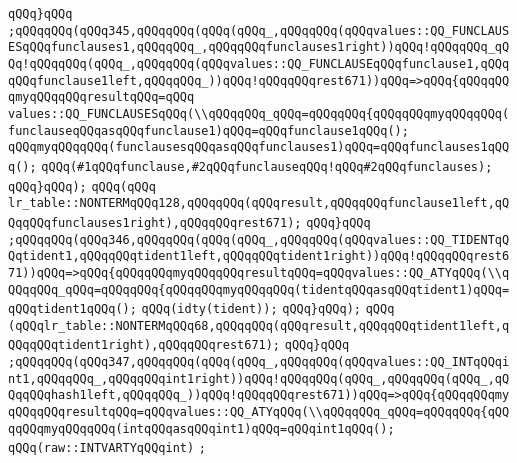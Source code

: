 \verb|qQQq}qQQq|\newline
\verb|;qQQqqQQq(qQQq345,qQQqqQQq(qQQq(qQQq_,qQQqqQQq(qQQqvalues::QQ_FUNCLAUSESqQQqfunclauses1,qQQqqQQq_,qQQqqQQqfunclauses1right))qQQq!qQQqqQQq_qQQq!qQQqqQQq(qQQq_,qQQqqQQq(qQQqvalues::QQ_FUNCLAUSEqQQqfunclause1,qQQqqQQqfunclause1left,qQQqqQQq_))qQQq!qQQqqQQqrest671))qQQq=>qQQq{qQQqqQQqmyqQQqqQQqresultqQQq=qQQq|\newline
\verb|values::QQ_FUNCLAUSESqQQq(\\qQQqqQQq_qQQq=qQQqqQQq{qQQqqQQqmyqQQqqQQq(funclauseqQQqasqQQqfunclause1)qQQq=qQQqfunclause1qQQq();|\newline
\verb|qQQqmyqQQqqQQq(funclausesqQQqasqQQqfunclauses1)qQQq=qQQqfunclauses1qQQq();|\newline
\verb|qQQq(#1qQQqfunclause,#2qQQqfunclauseqQQq!qQQq#2qQQqfunclauses);|\newline
\verb|qQQq}qQQq);|\newline
\verb|qQQq(qQQq|\newline
\verb|lr_table::NONTERMqQQq128,qQQqqQQq(qQQqresult,qQQqqQQqfunclause1left,qQQqqQQqfunclauses1right),qQQqqQQqrest671);|\newline
\verb|qQQq}qQQq|\newline
\verb|;qQQqqQQq(qQQq346,qQQqqQQq(qQQq(qQQq_,qQQqqQQq(qQQqvalues::QQ_TIDENTqQQqtident1,qQQqqQQqtident1left,qQQqqQQqtident1right))qQQq!qQQqqQQqrest671))qQQq=>qQQq{qQQqqQQqmyqQQqqQQqresultqQQq=qQQqvalues::QQ_ATYqQQq(\\qQQqqQQq_qQQq=qQQqqQQq{qQQqqQQqmyqQQqqQQq(tidentqQQqasqQQqtident1)qQQq=qQQqtident1qQQq();|\newline
\verb|qQQq(idty(tident));|\newline
\verb|qQQq}qQQq);|\newline
\verb|qQQq|\newline
\verb|(qQQqlr_table::NONTERMqQQq68,qQQqqQQq(qQQqresult,qQQqqQQqtident1left,qQQqqQQqtident1right),qQQqqQQqrest671);|\newline
\verb|qQQq}qQQq|\newline
\verb|;qQQqqQQq(qQQq347,qQQqqQQq(qQQq(qQQq_,qQQqqQQq(qQQqvalues::QQ_INTqQQqint1,qQQqqQQq_,qQQqqQQqint1right))qQQq!qQQqqQQq(qQQq_,qQQqqQQq(qQQq_,qQQqqQQqhash1left,qQQqqQQq_))qQQq!qQQqqQQqrest671))qQQq=>qQQq{qQQqqQQqmyqQQqqQQqresultqQQq=qQQqvalues::QQ_ATYqQQq(\\qQQqqQQq_qQQq=qQQqqQQq{qQQqqQQqmyqQQqqQQq(intqQQqasqQQqint1)qQQq=qQQqint1qQQq();|\newline
\verb|qQQq(raw::INTVARTYqQQqint)|\newline
\verb|;|\newline
